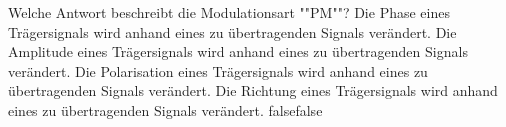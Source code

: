     {Welche Antwort beschreibt die Modulationsart ""PM""?}
    {Die Phase eines Trägersignals wird anhand eines zu übertragenden Signals verändert.}
    {Die Amplitude eines Trägersignals wird anhand eines zu übertragenden Signals verändert.}
    {Die Polarisation eines Trägersignals wird anhand eines zu übertragenden Signals verändert.}
    {Die Richtung eines Trägersignals wird anhand eines zu übertragenden Signals verändert.}
    {false}{false}